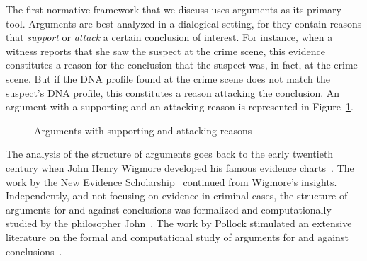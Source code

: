 \documentclass[10pt]{article}
\begin{document}
The first normative framework %
that we discuss uses arguments as its primary tool. 
Arguments are best analyzed in a dialogical setting, for they 
contain reasons that \textit{support} or \textit{attack} a certain conclusion of interest. For instance, when a witness reports that 
she saw the suspect at the crime scene, this evidence constitutes a reason for the conclusion that 
the suspect was, in fact, at the crime scene. But if the DNA profile found at the crime scene 
does not match the suspect's DNA profile, this constitutes 
a reason attacking the conclusion. An argument with a supporting and 
an attacking reason is represented in Figure~\ref{fig:arg}.

\begin{figure}[bt]
\centering

\caption{Arguments with supporting and attacking reasons\label{fig:arg}}
\end{figure}


The analysis of the structure of arguments goes back to the early twentieth century when John Henry Wigmore developed his famous evidence charts~\citep{wigmore1913}. The work by the New Evidence Scholarship~\citep{andersonEtal2005} continued from Wigmore's insights. Independently, and not focusing on evidence in criminal cases, the structure of arguments for and against conclusions was formalized and computationally studied by the philosopher John~\citet{pollock1987,pollock1995}. The work by Pollock stimulated an extensive literature on the formal and computational study of arguments for and against conclusions~\citep{vanEemerenEtal2014ch11}.
\end{document}
